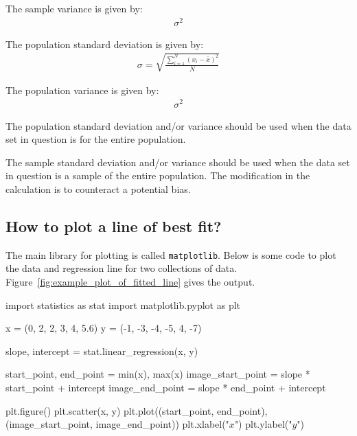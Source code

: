 The sample variance is given by:
\begin{equation*}
\begin{split}
\sigma ^ 2
\end{split}
\end{equation*}

The population standard deviation is given by:
\begin{equation*}
\begin{split}
\sigma = \sqrt{\frac{\sum_{i=1}^N{(x_i - \bar x) ^ 2}}{N}}
\end{split}
\end{equation*}

The population variance is given by:
\begin{equation*}
\begin{split}
\sigma ^ 2
\end{split}
\end{equation*}

The population standard deviation and/or variance should be used when the data set in question
is for the entire population.


The sample standard deviation and/or variance should be used when the data set in question is a
sample of the entire population. The modification in the calculation is to
counteract a potential bias.


\subsection{How to plot a line of best fit?}
\label{\detokenize{tools-for-mathematics/08-statistics/why/main:how-do-we-plot-a-line-of-best-fit}}

The main library for plotting is called \texttt{matplotlib}.
Below is some code to plot the data and regression line for two
collections of data. Figure~\ref{fig:example_plot_of_fitted_line} gives the output.

\begin{pyin}
import statistics as stat
import matplotlib.pyplot as plt

x = (0, 2, 2, 3, 4, 5.6)
y = (-1, -3, -4, -5, 4, -7)

slope, intercept = stat.linear_regression(x, y)

start_point, end_point = min(x), max(x)
image_start_point = slope * start_point + intercept
image_end_point = slope * end_point + intercept

plt.figure()
plt.scatter(x, y)
plt.plot((start_point, end_point), (image_start_point, image_end_point))
plt.xlabel("$x$")
plt.ylabel("$y$")
\end{pyin}



